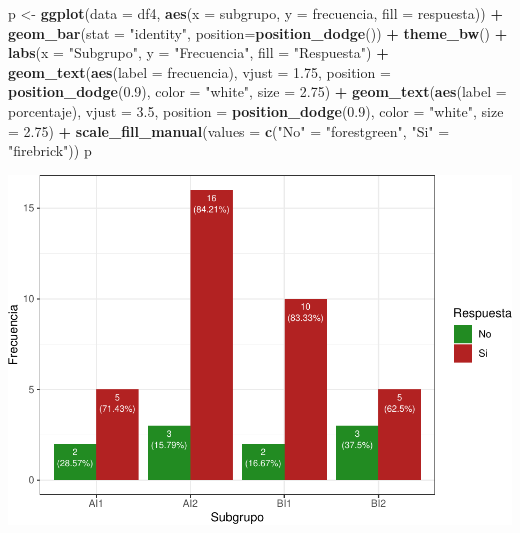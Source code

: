 \documentclass[
]{article}
\newenvironment{Shaded}{\begin{snugshade}}{\end{snugshade}}
\newcommand{\AttributeTok}[1]{\textcolor[rgb]{0.13,0.29,0.53}{#1}}
\newcommand{\FloatTok}[1]{\textcolor[rgb]{0.00,0.00,0.81}{#1}}
\newcommand{\FunctionTok}[1]{\textcolor[rgb]{0.13,0.29,0.53}{\textbf{#1}}}
\newcommand{\NormalTok}[1]{#1}
\newcommand{\OtherTok}[1]{\textcolor[rgb]{0.56,0.35,0.01}{#1}}
\newcommand{\SpecialCharTok}[1]{\textcolor[rgb]{0.81,0.36,0.00}{\textbf{#1}}}
\newcommand{\StringTok}[1]{\textcolor[rgb]{0.31,0.60,0.02}{#1}}
\begin{document}
\begin{Shaded}
\begin{Highlighting}[]
\NormalTok{p }\OtherTok{\textless{}{-}} \FunctionTok{ggplot}\NormalTok{(}\AttributeTok{data =}\NormalTok{ df4, }\FunctionTok{aes}\NormalTok{(}\AttributeTok{x =}\NormalTok{ subgrupo, }\AttributeTok{y =}\NormalTok{ frecuencia, }\AttributeTok{fill =}\NormalTok{ respuesta)) }\SpecialCharTok{+} 
  \FunctionTok{geom\_bar}\NormalTok{(}\AttributeTok{stat =} \StringTok{"identity"}\NormalTok{, }\AttributeTok{position=}\FunctionTok{position\_dodge}\NormalTok{()) }\SpecialCharTok{+}
  \FunctionTok{theme\_bw}\NormalTok{() }\SpecialCharTok{+} \FunctionTok{labs}\NormalTok{(}\AttributeTok{x =} \StringTok{"Subgrupo"}\NormalTok{, }\AttributeTok{y =} \StringTok{"Frecuencia"}\NormalTok{, }\AttributeTok{fill =} \StringTok{"Respuesta"}\NormalTok{) }\SpecialCharTok{+}
  \FunctionTok{geom\_text}\NormalTok{(}\FunctionTok{aes}\NormalTok{(}\AttributeTok{label =}\NormalTok{ frecuencia), }\AttributeTok{vjust =} \FloatTok{1.75}\NormalTok{, }\AttributeTok{position =} \FunctionTok{position\_dodge}\NormalTok{(}\FloatTok{0.9}\NormalTok{), }
            \AttributeTok{color =} \StringTok{"white"}\NormalTok{, }\AttributeTok{size =} \FloatTok{2.75}\NormalTok{) }\SpecialCharTok{+}
  \FunctionTok{geom\_text}\NormalTok{(}\FunctionTok{aes}\NormalTok{(}\AttributeTok{label =}\NormalTok{ porcentaje), }\AttributeTok{vjust =} \FloatTok{3.5}\NormalTok{, }\AttributeTok{position =} \FunctionTok{position\_dodge}\NormalTok{(}\FloatTok{0.9}\NormalTok{), }
            \AttributeTok{color =} \StringTok{"white"}\NormalTok{, }\AttributeTok{size =} \FloatTok{2.75}\NormalTok{) }\SpecialCharTok{+}
  \FunctionTok{scale\_fill\_manual}\NormalTok{(}\AttributeTok{values =} \FunctionTok{c}\NormalTok{(}\StringTok{"No"} \OtherTok{=} \StringTok{"forestgreen"}\NormalTok{, }\StringTok{"Si"} \OtherTok{=} \StringTok{"firebrick"}\NormalTok{))}
\NormalTok{p}
\end{Highlighting}
\end{Shaded}

\includegraphics{informe_files/figure-latex/unnamed-chunk-5-1.pdf}
\end{document}
